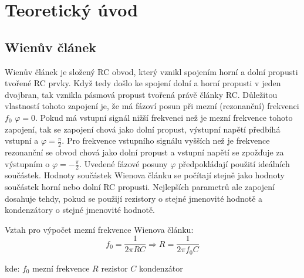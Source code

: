 \section*{Teoretický úvod}
		\subsection*{Wienův článek}
			\indent\indent
			Wienův článek je složený RC obvod, který vznikl spojením horní a dolní propusti tvořené RC prvky. Když tedy došlo ke spojení dolní a horní propusti v jeden dvojbran, tak vznikla pásmová propust tvořená právě články RC. Důležitou vlastností tohoto zapojení je, že má fázoví posun při mezní (rezonanční) frekvenci $f_0$ $\varphi = 0$. Pokud má vstupní signál nižší frekvenci než je mezní frekvence tohoto zapojení, tak se zapojení chová jako dolní propust, výstupní napětí předbíhá vstupní a $\varphi=\frac{\pi}{2}$. Pro frekvence vstupního signálu vyšších než je frekvence rezonanční se obvod chová jako dolní propust a vstupní napětí se zpožďuje za výstupním o $\varphi = -\frac{\pi}{2}$. Uvedené fázové posuny $\varphi$ předpokládají použití ideálních součástek. Hodnoty součástek Wienova článku se počítají stejně jako hodnoty součástek horní nebo dolní RC propusti. Nejlepších parametrů ale zapojení dosahuje tehdy, pokud se použijí rezistory o stejné jmenovité hodnotě a kondenzátory o stejné jmenovité hodnotě.
			
			Vztah pro výpočet mezní frekvence Wienova článku:
			\begin{equation}
  				f_0 = \dfrac{1}{2\pi R C} \Rightarrow R = \dfrac{1}{2\pi f_0 C}
  			\end{equation}		
		
			\hspace*{2cm}kde:\newline    
  			\hspace*{4cm}$f_0$ \dotfill mezní frekvence\hspace*{4cm}\newline
	  		\hspace*{4cm}$R$ \dotfill rezistor\hspace*{4cm}\newline
	  		\hspace*{4cm}$C$ \dotfill kondenzátor\hspace*{4cm}\newline
			
